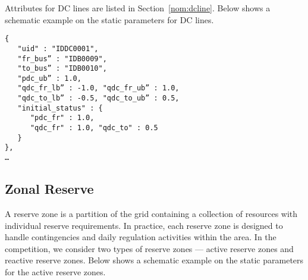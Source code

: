 Attributes for DC lines are listed in Section~\ref{nom:dcline}.
Below shows a schematic example on the static parameters for DC lines.
\begin{verbatim}
{
   "uid" : "IDDC0001",
   "fr_bus” : "IDB0009", 
   "to_bus” : "IDB0010",
   "pdc_ub” : 1.0, 
   "qdc_fr_lb” : -1.0, "qdc_fr_ub” : 1.0,
   "qdc_to_lb” : -0.5, "qdc_to_ub” : 0.5,
   "initial_status" : {
      "pdc_fr" : 1.0, 
      "qdc_fr" : 1.0, "qdc_to" : 0.5 
   }
},
…    
\end{verbatim}



\subsection{Zonal Reserve}
\label{sec:reserve}
A reserve zone is a partition of the grid containing a collection of resources with individual reserve requirements.
In practice, each reserve zone is designed to handle contingencies 
and daily regulation activities within the area.
In the competition, we consider two types of reserve zones --- active reserve zones and reactive reserve zones. 
Below shows a schematic example on the static parameters for the active reserve zones. 

